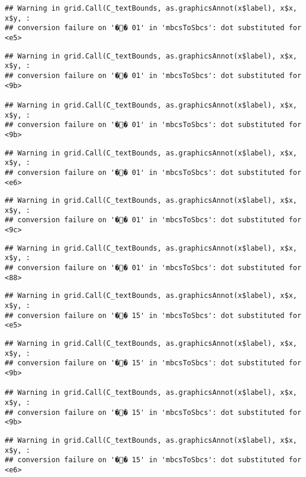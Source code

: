 \documentclass[]{article}
\begin{document}
\begin{verbatim}
## Warning in grid.Call(C_textBounds, as.graphicsAnnot(x$label), x$x, x$y, :
## conversion failure on '�� 01' in 'mbcsToSbcs': dot substituted for <e5>
\end{verbatim}

\begin{verbatim}
## Warning in grid.Call(C_textBounds, as.graphicsAnnot(x$label), x$x, x$y, :
## conversion failure on '�� 01' in 'mbcsToSbcs': dot substituted for <9b>

## Warning in grid.Call(C_textBounds, as.graphicsAnnot(x$label), x$x, x$y, :
## conversion failure on '�� 01' in 'mbcsToSbcs': dot substituted for <9b>
\end{verbatim}

\begin{verbatim}
## Warning in grid.Call(C_textBounds, as.graphicsAnnot(x$label), x$x, x$y, :
## conversion failure on '�� 01' in 'mbcsToSbcs': dot substituted for <e6>
\end{verbatim}

\begin{verbatim}
## Warning in grid.Call(C_textBounds, as.graphicsAnnot(x$label), x$x, x$y, :
## conversion failure on '�� 01' in 'mbcsToSbcs': dot substituted for <9c>
\end{verbatim}

\begin{verbatim}
## Warning in grid.Call(C_textBounds, as.graphicsAnnot(x$label), x$x, x$y, :
## conversion failure on '�� 01' in 'mbcsToSbcs': dot substituted for <88>
\end{verbatim}

\begin{verbatim}
## Warning in grid.Call(C_textBounds, as.graphicsAnnot(x$label), x$x, x$y, :
## conversion failure on '�� 15' in 'mbcsToSbcs': dot substituted for <e5>
\end{verbatim}

\begin{verbatim}
## Warning in grid.Call(C_textBounds, as.graphicsAnnot(x$label), x$x, x$y, :
## conversion failure on '�� 15' in 'mbcsToSbcs': dot substituted for <9b>

## Warning in grid.Call(C_textBounds, as.graphicsAnnot(x$label), x$x, x$y, :
## conversion failure on '�� 15' in 'mbcsToSbcs': dot substituted for <9b>
\end{verbatim}

\begin{verbatim}
## Warning in grid.Call(C_textBounds, as.graphicsAnnot(x$label), x$x, x$y, :
## conversion failure on '�� 15' in 'mbcsToSbcs': dot substituted for <e6>
\end{verbatim}
\end{document}
